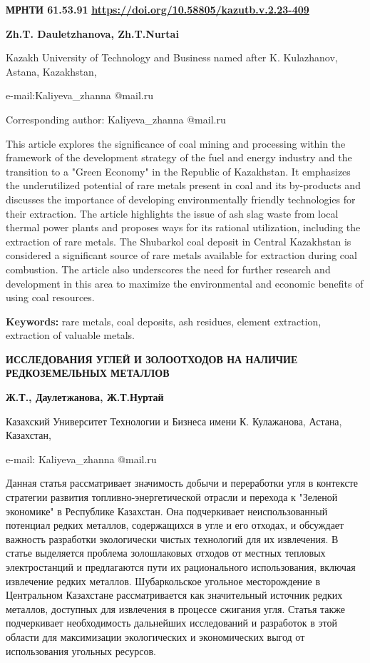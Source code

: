 \newpage
{\bfseries МРНТИ 61.53.91}
\hfill {\bfseries \href{https://doi.org/10.58805/kazutb.v.2.23-409}{https://doi.org/10.58805/kazutb.v.2.23-409}}


\begin{center}
{\bfseries Zh.T. Dauletzhanova, Zh.T.Nurtai}

Kazakh University of Technology and Business named after K. Kulazhanov,
Astana, Kazakhstan,

e-mail:Kaliyeva\_zhanna @mail.ru

Corresponding author: Kaliyeva\_zhanna @mail.ru
\end{center}

This article explores the significance of coal mining and processing
within the framework of the development strategy of the fuel and energy
industry and the transition to a "Green Economy" in the Republic of
Kazakhstan. It emphasizes the underutilized potential of rare metals
present in coal and its by-products and discusses the importance of
developing environmentally friendly technologies for their extraction.
The article highlights the issue of ash slag waste from local thermal
power plants and proposes ways for its rational utilization, including
the extraction of rare metals. The Shubarkol coal deposit in Central
Kazakhstan is considered a significant source of rare metals available
for extraction during coal combustion. The article also underscores the
need for further research and development in this area to maximize the
environmental and economic benefits of using coal resources.

{\bfseries Keywords:} rare metals, coal deposits, ash residues, element
extraction, extraction of valuable metals.

\begin{center}
{\large\bfseries ИССЛЕДОВАНИЯ УГЛЕЙ И ЗОЛООТХОДОВ НА НАЛИЧИЕ РЕДКОЗЕМЕЛЬНЫХ МЕТАЛЛОВ}

{\bfseries Ж.Т., Даулетжанова, Ж.Т.Нуртай}

Казахский Университет Технологии и Бизнеса имени К. Кулажанова, Астана,
Казахстан,

e-mail: Kaliyeva\_zhanna @mail.ru
\end{center}

Данная статья рассматривает значимость добычи и переработки угля в
контексте стратегии развития топливно-энергетической отрасли и перехода
к "Зеленой экономике" в Республике Казахстан. Она подчеркивает
неиспользованный потенциал редких металлов, содержащихся в угле и его
отходах, и обсуждает важность разработки экологически чистых технологий
для их извлечения. В статье выделяется проблема золошлаковых отходов от
местных тепловых электростанций и предлагаются пути их рационального
использования, включая извлечение редких металлов. Шубаркольское
угольное месторождение в Центральном Казахстане рассматривается как
значительный источник редких металлов, доступных для извлечения в
процессе сжигания угля. Статья также подчеркивает необходимость
дальнейших исследований и разработок в этой области для максимизации
экологических и экономических выгод от использования угольных ресурсов.

